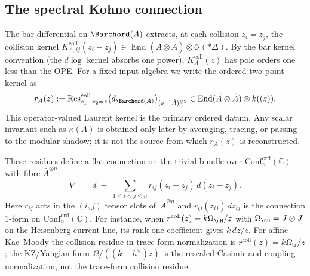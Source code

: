 \subsection*{The spectral Kohno connection}

\begin{construction}
\label{constr:r-matrix-monodromy-vol1}
The bar differential on $\Barchord(A)$ extracts, at each
collision $z_i=z_j$, the collision kernel
$K_{A,ij}^{\mathrm{coll}}(z_i-z_j)
\in\operatorname{End}(\bar A\otimes\bar A)\otimes
\mathcal{O}(*\Delta)$. By the bar kernel convention (the $d\log$
kernel absorbs one power), $K_A^{\mathrm{coll}}(z)$ has pole
orders one less than the OPE.
For a fixed input algebra we write the ordered two-point kernel as
\begin{equation}\label{eq:ordered-classical-r-kernel-A}
r_A(z)
:=
\operatorname{Res}^{\mathrm{coll}}_{z_1-z_2=z}
\bigl(d_{\Barchord(A)}\bigr)_{(s^{-1}\bar A)^{\otimes 2}}
\in
\operatorname{End}(\bar A\otimes\bar A)\otimes k((z)).
\end{equation}
This operator-valued Laurent kernel is the primary ordered datum.
Any scalar invariant such as $\kappa(A)$ is obtained only later by
averaging, tracing, or passing to the modular shadow; it is not the
source from which $r_A(z)$ is reconstructed.

These residues define a flat connection on the trivial bundle
over $\mathrm{Conf}_n^{\mathrm{ord}}(\mathbb{C})$ with fibre
$\bar A^{\otimes n}$:
\begin{equation}\label{eq:kohno-connection}
\nabla
\;=\;
d
\;-\;
\sum_{1\leq i<j\leq n}
r_{ij}(z_i-z_j)\,d(z_i-z_j).
\end{equation}
Here $r_{ij}$ acts in the $(i,j)$ tensor slots of~$\bar A^{\otimes n}$
and $r_{ij}(z_{ij})\,dz_{ij}$ is the connection $1$-form
on $\mathrm{Conf}_n^{\mathrm{ord}}(\mathbb{C})$.
For instance, when
$r^{\mathrm{coll}}(z)=k\Omega_{\cH}/z$ with
$\Omega_{\cH}=J\otimes J$ on the Heisenberg current line, its
rank-one coefficient gives $k\,dz/z$. For affine Kac--Moody the collision residue
in trace-form normalization is
$r^{\mathrm{coll}}(z)=k\Omega_{\mathrm{tr}}/z$; the
KZ/Yangian form $\Omega/((k+h^\vee)z)$ is the rescaled
Casimir-and-coupling normalization, not the trace-form collision
residue.


\end{construction}

